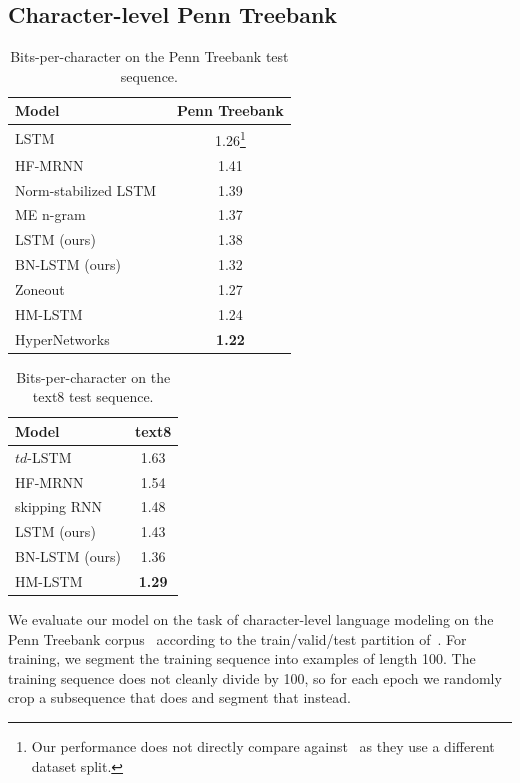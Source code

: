 \documentclass{article} %
\begin{document}
\subsection{Character-level Penn Treebank}
\begin{table}%
  \center
\begin{tabular}{@{}lc@{}}
  \toprule
  \bf Model & \bf Penn Treebank \\
  \midrule
  LSTM~\citep{graves2013generating} &  1.26\footnote{Our performance does not directly compare against~\citep{graves2013generating} as they use a different dataset split.}\\
  \midrule
  HF-MRNN~\citep{mikolov2012subword} & 1.41 \\
  Norm-stabilized LSTM~\citep{krueger} & 1.39 \\
  ME n-gram~\citep{mikolov2012subword} & 1.37 \\
  \midrule
  LSTM (ours) & 1.38 \\
  BN-LSTM (ours) & 1.32 \\
  \midrule
  Zoneout~\citep{krueger2016zoneout} & 1.27 \\
  HM-LSTM~\citep{chung2016hierarchical} & 1.24 \\
  HyperNetworks~\citep{ha2016hypernetworks} & \textbf{1.22} \\
  \bottomrule
\end{tabular}
\caption{Bits-per-character on the Penn Treebank test sequence.}
\label{tab:ptb_test}
\end{table}
\begin{table}%
  \center
  \begin{tabular}{@{}lc@{}}
  \toprule
  \bf Model & \bf text8 \\
  \midrule
  $td$-LSTM~\citep{zhang2016architectural} & 1.63 \\
  HF-MRNN~\citep{mikolov2012subword} & 1.54 \\
  skipping RNN~\citep{pachitariu2013regularization} & 1.48 \\
  \midrule
  LSTM (ours) &  1.43 \\
  BN-LSTM (ours) & 1.36 \\
  \midrule
  HM-LSTM~\citep{chung2016hierarchical} & \textbf{1.29} \\
  \bottomrule
\end{tabular}
\caption{Bits-per-character on the text8 test sequence.}
\label{tab:text8_test}
\end{table}
We evaluate our model on the task of character-level language modeling on the
Penn Treebank corpus~\citep{penntreebank} according to the train/valid/test
partition of~\citet{mikolov2012subword}.  For training, we segment the training
sequence into examples of length 100.  The training sequence does not cleanly
divide by 100, so for each epoch we randomly crop a subsequence that does and
segment that instead.
\end{document}
